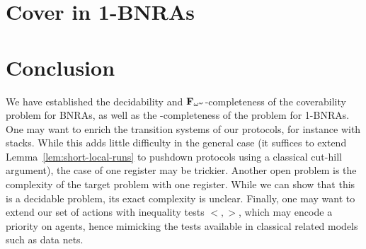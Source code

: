 \documentclass[a4paper,UKenglish,cleveref, autoref, thm-restate]{lipics-v2021}
\begin{document}
	
%
	
	
	
	\section{Cover in 1-BNRAs}
	\label{sec:cover-1BNRA}
	
	
	
%	
%
	\section{Conclusion}
	We have established the decidability and $\mathbf{F}_{\omega^\omega}$-completeness of the coverability problem for BNRAs, as well as the \NP-completeness of the problem for 1-BNRAs.
	One may want to enrich the transition systems of our protocols, for instance with stacks. While this adds little difficulty in the general case (it suffices to extend Lemma~\ref{lem:short-local-runs} to pushdown protocols using a classical cut-hill argument), the case of one register may be trickier.
	Another open problem is the complexity of the target problem with one register. While we can show that this is a decidable problem, its exact complexity is unclear. 
	Finally, one may want to extend our set of actions with inequality tests $<, >$, which may encode a priority on agents, hence mimicking the tests available in classical related models such as data nets.
	
	
	
	\newpage
	
	\appendix
	
	 
	

	
	
	
	
	
	
\end{document}
